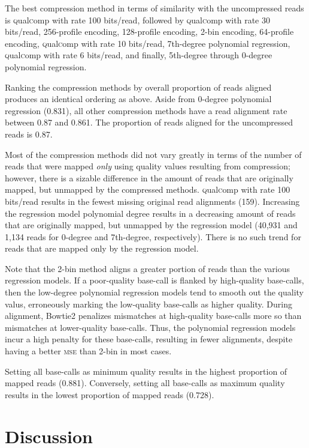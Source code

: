 \documentclass{bioinfo}
\begin{document}
The best compression method in terms of similarity with the
uncompressed reads is \textsc{q}ual\textsc{c}omp with rate 100
bits/read, followed by \textsc{q}ual\textsc{c}omp with rate 30
bits/read, 256-profile encoding, 128-profile encoding, 2-bin encoding,
64-profile encoding, \textsc{q}ual\textsc{c}omp with rate 10
bits/read, 7th-degree polynomial regression,
\textsc{q}ual\textsc{c}omp with rate 6 bits/read, and finally,
5th-degree through 0-degree polynomial regression.

Ranking the compression methods by overall proportion of reads aligned
produces an identical ordering as above. Aside from 0-degree
polynomial regression (0.831), all other compression methods have a
read alignment rate between 0.87 and 0.861. The proportion of reads
aligned for the uncompressed reads is 0.87.

Most of the compression methods did not vary greatly in terms of the
number of reads that were mapped \emph{only} using quality values
resulting from compression; however, there is a sizable difference in
the amount of reads that are originally mapped, but unmapped by the
compressed methods.  \textsc{q}ual\textsc{c}omp with rate 100
bits/read results in the fewest missing original read alignments
(159). Increasing the regression model polynomial degree results in a
decreasing amount of reads that are originally mapped, but unmapped by
the regression model (40,931 and 1,134 reads for 0-degree and
7th-degree, respectively). There is no such trend for reads that are
mapped only by the regression model.

Note that the 2-bin method aligns a greater portion of reads than the
various regression models. If a poor-quality base-call is flanked by
high-quality base-calls, then the low-degree polynomial regression
models tend to smooth out the quality valus, erroneously marking the
low-quality base-calls as higher quality.  During alignment, Bowtie2
penalizes mismatches at high-quality base-calls more so than
mismatches at lower-quality base-calls. Thus, the polynomial
regression models incur a high penalty for these base-calls, resulting
in fewer alignments, despite having a better \textsc{mse} than 2-bin
in most cases.

Setting all base-calls as minimum quality results in the highest
proportion of mapped reads (0.881). Conversely, setting all base-calls
as maximum quality results in the lowest proportion of mapped reads
(0.728).

\section{Discussion}
\end{document}
